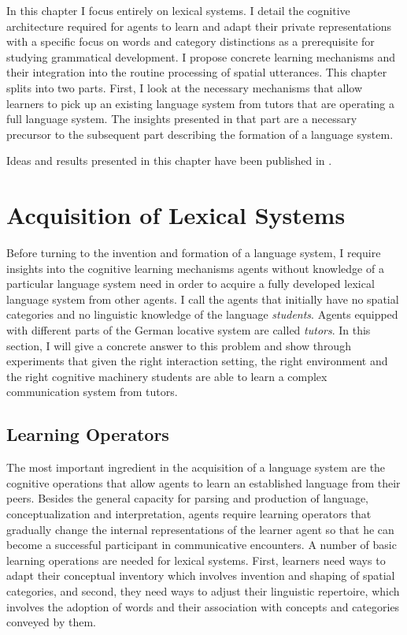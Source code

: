 In this chapter I focus entirely on lexical systems. 
I detail the cognitive architecture required for agents to learn 
and adapt their private representations with a specific
focus on words and category distinctions as a prerequisite 
for studying grammatical development. I propose concrete 
learning mechanisms and their integration into the
routine processing of spatial utterances. This chapter splits into 
two parts. First, I look at the necessary mechanisms that allow 
learners to pick up an existing language system from tutors that 
are operating a full language system. The insights presented in 
that part are a necessary precursor to the subsequent part 
describing the  formation of a language system. 

Ideas and results presented in this chapter have been 
published in \citep{spranger2012basic,spranger2013acquisition}.

\section{Acquisition of Lexical Systems}
\label{s:category-acquisition}
Before turning to the invention and formation of a language system, I require
insights into the cognitive learning mechanisms agents without knowledge 
of a particular language system need in order to acquire a fully developed lexical language
system from other agents. I call the agents that initially have no spatial categories
and no linguistic knowledge of the language \emph{students}. Agents
equipped with different parts of the German locative system are called \emph{tutors}.
In this section, I will give a concrete answer to this 
problem and show through experiments that given the right interaction setting,
the right environment and the right cognitive machinery students are able to learn 
a complex communication system from tutors.

\subsection{Learning Operators}
The most important ingredient in the acquisition of a language system are
the cognitive operations that allow agents to learn an established language
from their peers. Besides the general capacity for parsing and production 
of language, conceptualization and interpretation, 
agents require learning operators that gradually change
the internal representations of the learner agent so that he can become a 
successful participant in communicative encounters. A number of basic learning
operations are needed for lexical systems. First, learners need ways to adapt
their conceptual inventory which involves invention and shaping of spatial categories, 
and second, they need ways to adjust their linguistic repertoire, which involves 
the adoption of words and their association with concepts and categories 
conveyed by them. 

